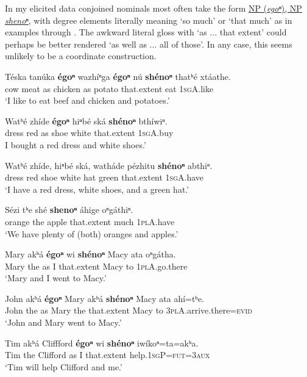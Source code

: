 \documentclass[output=paper]{LSP/langsci}
\begin{document}
In my elicited data conjoined nominals most often take the form \underline{NP (\textit{egoⁿ}), NP} \underline{\textit{shenoⁿ}}, with degree elements literally meaning `so much' or `that much' as in examples  through . The awkward literal gloss with `as ... that extent' could perhaps be better rendered `as well as ... all of those'. In any case, this seems unlikely to be a coordinate construction.

\begin{exe}
\ex\label{ex:rudin:18}
\gll Téska 	tanúka 	\textbf{égoⁿ} 	wazhíⁿga 	\textbf{égoⁿ}	nú \textbf{shénoⁿ} thatʰé  xtáathe.\\
	cow   	meat    	as     	chicken   	as     	potato 	that.extent 	eat      	\textsc{1sgA}.like\\
\trans `I like to eat beef and chicken and potatoes.'    
 
 \ex\label{ex:rudin:19}
\gll Watʰé 	zhíde 	\textbf{égoⁿ} 	hiⁿbé 	ská    \textbf{	shénoⁿ}  	bthíwiⁿ.\\
	dress   	red  	as   	shoe 	white 	that.extent 	\textsc{1sgA}.buy\\
\trans I bought a red dress and white shoes.'  

\ex\label{ex:rudin:20}
\gll Watʰé  zhíde,  hiⁿbé	ská,  watháde  pézhitu \textbf{shénoⁿ} abthiⁿ.\\ 
dress   	red   	shoe 	white 	hat  	green 	that.extent 	\textsc{1sgA}.have \\
\trans `I have a red dress, white shoes, and a green hat.'   

\ex\label{ex:rudin:21}
\gll Sézi  	tʰe 	shé  	\textbf{shenoⁿ} 	áhige 	oⁿgáthiⁿ. \\
	orange 	the 	apple 	that.extent 	much  	\textsc{1plA}.have \\
\trans `We have plenty of (both) oranges and apples.'

\ex\label{ex:rudin:22}
\gll Mary akʰá  	\textbf{égoⁿ} wi \textbf{shénoⁿ} Macy ata oⁿgátha. \\
 Mary	the  as  	I 	that.extent  	Macy to 	\textsc{1plA}.go.there \\
\trans `Mary and I went to Macy.'

\ex\label{ex:rudin:23}
\gll John akʰá \textbf{égoⁿ} Mary akʰá \textbf{shénoⁿ} Macy ata ahí=tʰe. \\
 John the 	as  Mary the 	that.extent  Macy to \textsc{3plA}.arrive.there=\textsc{evid} \\
\trans `John and Mary went to Macy.'
 
\ex\label{ex:rudin:24} 
\gll Tim akʰá Cliffford \textbf{égoⁿ} wi \textbf{shénoⁿ} iwíkoⁿ=ta=akʰa. \\
Tim the Clifford as 	I  that.extent  help.\textsc{1sgP}=\textsc{fut=3aux} \\
\trans `Tim will help Clifford and me.'
\end{exe}
\end{document}
